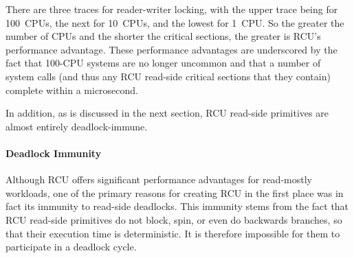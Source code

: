 \QuickQuizEnd

There are three traces for reader-writer locking, with the upper trace
being for 100~CPUs, the next for 10~CPUs, and the lowest for 1~CPU.
So the greater the number of CPUs and the shorter the critical sections,
the greater is RCU's performance advantage.
These performance advantages are underscored by the fact that 100-CPU
systems are no longer uncommon and that a number of system calls (and
thus any RCU read-side critical sections that they contain) complete
within a microsecond.

In addition, as is discussed in the next section,
RCU read-side primitives are almost entirely deadlock-immune.


\paragraph{Deadlock Immunity}

Although RCU offers significant performance advantages for
read-mostly workloads, one of the primary reasons for creating
RCU in the first place was in fact its immunity to read-side
deadlocks.
This immunity stems from the fact that
RCU read-side primitives do not block, spin, or even
do backwards branches, so that their execution time is deterministic.
It is therefore impossible for them to participate in a deadlock
cycle.

